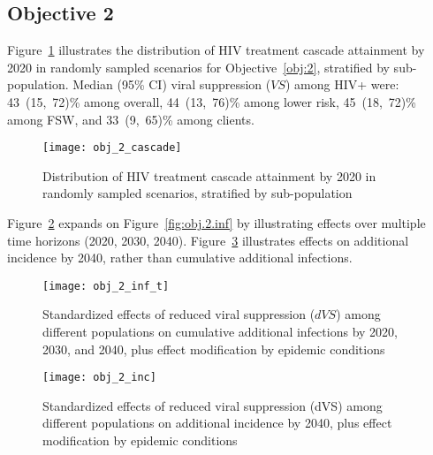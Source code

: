 \subsection{Objective 2}\label{a:res.2}
Figure~\ref{fig:obj.2.cascade} illustrates
the distribution of HIV treatment cascade attainment by 2020
in randomly sampled scenarios for Objective~\ref{obj:2}, stratified by sub-population.
Median (95\% CI) viral suppression ($VS$) among HIV+ were: %
43~(15,~72)\% among overall,
44~(13,~76)\% among lower risk,
45~(18,~72)\% among FSW, and
33~(9,~65)\% among clients.
\begin{figure}[h]
  \centerline{\texttt{[image: obj\_2\_cascade]}}
  \caption{Distribution of HIV treatment cascade attainment by 2020
    in randomly sampled scenarios, stratified by sub-population}
  \label{fig:obj.2.cascade}
\end{figure}
\par
Figure~\ref{fig:obj.2.inf.t} expands on Figure~\ref{fig:obj.2.inf}
by illustrating effects over multiple time horizons (2020, 2030, 2040).
Figure~\ref{fig:obj.2.inc} illustrates effects on additional incidence by 2040,
rather than cumulative additional infections.
\begin{figure}
  \texttt{[image: obj\_2\_inf\_t]}
  \caption{Standardized effects of reduced viral suppression ($dVS$) among different populations
    on cumulative additional infections by 2020, 2030, and 2040,
    plus effect modification by epidemic conditions}
  \label{fig:obj.2.inf.t}
\end{figure}
\begin{figure}
  \texttt{[image: obj\_2\_inc]}
  \caption{Standardized effects of reduced viral suppression (dVS) among different populations
    on additional incidence by 2040,
    plus effect modification by epidemic conditions}
  \label{fig:obj.2.inc}
\end{figure}




